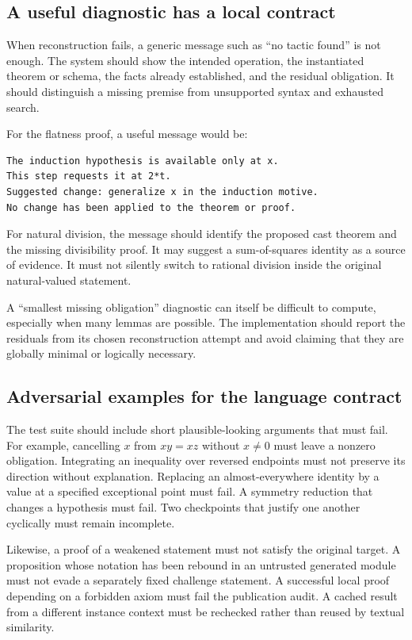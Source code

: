 \documentclass[11pt,a4paper]{article}
\theoremstyle{definition}
\theoremstyle{remark}
\begin{document}
\subsection{A useful diagnostic has a local contract}
When reconstruction fails, a generic message such as ``no tactic found'' is not enough. The system should show the intended operation, the instantiated theorem or schema, the facts already established, and the residual obligation. It should distinguish a missing premise from unsupported syntax and exhausted search.

For the flatness proof, a useful message would be:
\begin{lstlisting}
The induction hypothesis is available only at x.
This step requests it at 2*t.
Suggested change: generalize x in the induction motive.
No change has been applied to the theorem or proof.
\end{lstlisting}
For natural division, the message should identify the proposed cast theorem and the missing divisibility proof. It may suggest a sum-of-squares identity as a source of evidence. It must not silently switch to rational division inside the original natural-valued statement.

A ``smallest missing obligation'' diagnostic can itself be difficult to compute, especially when many lemmas are possible. The implementation should report the residuals from its chosen reconstruction attempt and avoid claiming that they are globally minimal or logically necessary.

\subsection{Adversarial examples for the language contract}
The test suite should include short plausible-looking arguments that must fail. For example, cancelling $x$ from $xy=xz$ without $x\ne0$ must leave a nonzero obligation. Integrating an inequality over reversed endpoints must not preserve its direction without explanation. Replacing an almost-everywhere identity by a value at a specified exceptional point must fail. A symmetry reduction that changes a hypothesis must fail. Two checkpoints that justify one another cyclically must remain incomplete.

Likewise, a proof of a weakened statement must not satisfy the original target. A proposition whose notation has been rebound in an untrusted generated module must not evade a separately fixed challenge statement. A successful local proof depending on a forbidden axiom must fail the publication audit. A cached result from a different instance context must be rechecked rather than reused by textual similarity.
\end{document}
